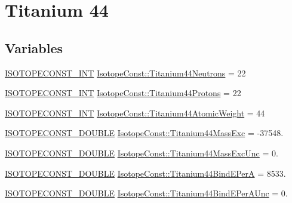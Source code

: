 \hypertarget{group___isotope_const-_titanium-_ti44}{}\section{Titanium 44}
\label{group___isotope_const-_titanium-_ti44}
\subsection*{Variables}
\begin{DoxyCompactItemize}
\item 
\mbox{\hyperlink{group___isotope_const-_macros_ga5f18360b3e99483a35c32d789e62621c}{I\+S\+O\+T\+O\+P\+E\+C\+O\+N\+S\+T\+\_\+\+I\+NT}} \mbox{\hyperlink{group___isotope_const-_titanium-_ti44_ga0d41964881aab19c65ecc51eaa06dc9f}{Isotope\+Const\+::\+Titanium44\+Neutrons}} = 22
\item 
\mbox{\hyperlink{group___isotope_const-_macros_ga5f18360b3e99483a35c32d789e62621c}{I\+S\+O\+T\+O\+P\+E\+C\+O\+N\+S\+T\+\_\+\+I\+NT}} \mbox{\hyperlink{group___isotope_const-_titanium-_ti44_ga22cc0e336c5107ffd986453a066f4a66}{Isotope\+Const\+::\+Titanium44\+Protons}} = 22
\item 
\mbox{\hyperlink{group___isotope_const-_macros_ga5f18360b3e99483a35c32d789e62621c}{I\+S\+O\+T\+O\+P\+E\+C\+O\+N\+S\+T\+\_\+\+I\+NT}} \mbox{\hyperlink{group___isotope_const-_titanium-_ti44_ga956d4cc15d08664daa8f3f5f180dc21c}{Isotope\+Const\+::\+Titanium44\+Atomic\+Weight}} = 44
\item 
\mbox{\hyperlink{group___isotope_const-_macros_ga8f45a7272ce02c0b4c65c44636ed719a}{I\+S\+O\+T\+O\+P\+E\+C\+O\+N\+S\+T\+\_\+\+D\+O\+U\+B\+LE}} \mbox{\hyperlink{group___isotope_const-_titanium-_ti44_ga3266a35bb833f2b8ea515fcf7855705e}{Isotope\+Const\+::\+Titanium44\+Mass\+Exc}} = -\/37548.
\item 
\mbox{\hyperlink{group___isotope_const-_macros_ga8f45a7272ce02c0b4c65c44636ed719a}{I\+S\+O\+T\+O\+P\+E\+C\+O\+N\+S\+T\+\_\+\+D\+O\+U\+B\+LE}} \mbox{\hyperlink{group___isotope_const-_titanium-_ti44_ga04d46384fea2ab73813171f3a3cadd47}{Isotope\+Const\+::\+Titanium44\+Mass\+Exc\+Unc}} = 0.
\item 
\mbox{\hyperlink{group___isotope_const-_macros_ga8f45a7272ce02c0b4c65c44636ed719a}{I\+S\+O\+T\+O\+P\+E\+C\+O\+N\+S\+T\+\_\+\+D\+O\+U\+B\+LE}} \mbox{\hyperlink{group___isotope_const-_titanium-_ti44_ga55211150e99d1f9d53691a0e6026c574}{Isotope\+Const\+::\+Titanium44\+Bind\+E\+PerA}} = 8533.
\item 
\mbox{\hyperlink{group___isotope_const-_macros_ga8f45a7272ce02c0b4c65c44636ed719a}{I\+S\+O\+T\+O\+P\+E\+C\+O\+N\+S\+T\+\_\+\+D\+O\+U\+B\+LE}} \mbox{\hyperlink{group___isotope_const-_titanium-_ti44_ga2e9dbee390c07dcbb8ca5df0c9b194b9}{Isotope\+Const\+::\+Titanium44\+Bind\+E\+Per\+A\+Unc}} = 0.

\end{DoxyCompactItemize}
